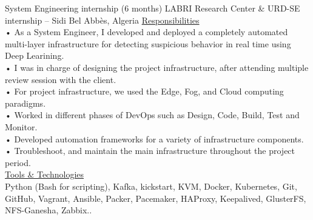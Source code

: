 \documentclass{cv}
\begin{document}
    {System Engineering internship (6 months)
    }
    {LABRI Research Center  \& URD-SE internship -- Sidi Bel Abbès, Algeria\vspace{.2cm}}
    {
      \underline {Responsibilities}\vspace{.2cm}\\
      • As a System Engineer, I developed and deployed a completely automated multi-layer infrastructure 
      for detecting suspicious behavior in real time using Deep Learining.\\
      • I was in charge of designing the project infrastructure, after attending multiple review session 
      with the client.\\
      • For project infrastructure, we used the Edge, Fog, and Cloud computing paradigms.\\
      • Worked in different phases of DevOps such as Design, Code, Build, Test and Monitor.\\
      • Developed automation frameworks for a variety of infrastructure components.\\
      • Troubleshoot, and maintain the main infrastructure throughout the project period.\\
      \underline {Tools \& Technologies}\\
      Python (Bash for scripting), Kafka, kickstart, KVM, Docker, Kubernetes, Git, GitHub, Vagrant, Ansible, Packer, Pacemaker, HAProxy, Keepalived, GlusterFS, NFS-Ganesha, Zabbix..\\
    }
\end{document}
